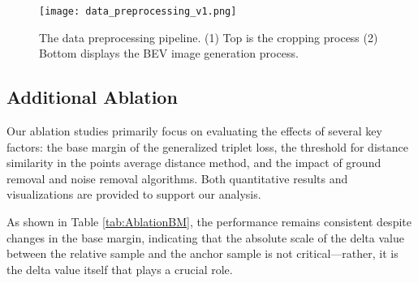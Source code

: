 \begin{figure*}[t]
    \centering
    \texttt{[image: data\_preprocessing\_v1.png]}
    \caption{The data preprocessing pipeline. (1) Top is the cropping process (2) Bottom displays the BEV image generation process.}
    \label{fig:datapreprocessing}
\end{figure*}


\subsection{Additional Ablation}
Our ablation studies primarily focus on evaluating the effects of several key factors: the base margin of the generalized triplet loss, the threshold for distance similarity in the points average distance method, and the impact of ground removal and noise removal algorithms. Both quantitative results and visualizations are provided to support our analysis.


\begin{table}[!t]
    \centering
    \caption{ABLATION STUDIES ON BASE MARGIN}
    \label{tab:AblationBM}
\end{table}


As shown in Table \ref{tab:AblationBM}, the performance remains consistent despite changes in the base margin, indicating that the absolute scale of the delta value between the relative sample and the anchor sample is not critical—rather, it is the delta value itself that plays a crucial role.

